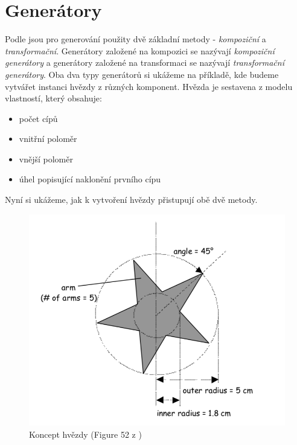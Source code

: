 \section{Generátory}
Podle \cite{Czarnecki98} jsou pro generování použity dvě základní metody - \textit{kompoziční} a \textit{transformační}. Generátory založené na kompozici se nazývají \textit{kompoziční generátory} a generátory založené na transformaci se nazývají \textit{transformační generátory}. Oba dva typy generátorů si ukážeme na příkladě, kde budeme vytvářet instanci hvězdy z různých komponent. Hvězda je sestavena z modelu vlastností, který obsahuje:
\begin{itemize}
	\item počet cípů
	\item vnitřní poloměr
	\item vnější poloměr
	\item úhel popisující naklonění prvního cípu
\end{itemize}
Nyní si ukážeme, jak k vytvoření hvězdy přistupují obě dvě metody.
\begin{figure}[H]
	\centering
	\includegraphics[width=13cm]{images/star_features}
	\caption{Koncept hvězdy (Figure 52 z \cite{Czarnecki98} )}
\end{figure}

